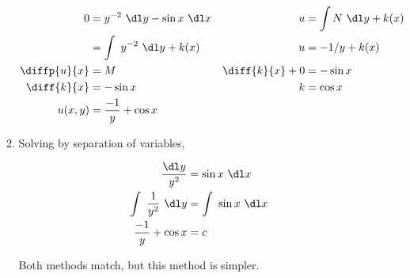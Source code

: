 \begin{enumerate}
\begin{enumerate}
                    \begin{align}
                        0               & = y^{-2}\ \dl y- \sin x\ \dl x &
                        u               & = \int N\ \dl y+ k(x)            \\
                                        & = \int\ y^{-2}\ \dl y+ k(x)    &
                        u               & = -1/y + k(x)                    \\
                        \diffp{u}{x}    & = M                            &
                        \diff{k}{x} + 0 & = -\sin x                        \\
                        \diff{k}{x}     & = -\sin x                      &
                        k               & = \cos x                         \\
                        u(x, y)         & = \frac{-1}{y} + \cos x
                    \end{align}


              \item Solving by separation of variables,

                    \begin{align}
                        \frac{\dl y}{y^{2}}          & = \sin x\ \dl x       \\
                        \int\ \frac{1}{y^{2}}\ \dl y & = \int\ \sin x\ \dl x \\
                        \frac{-1}{y} + \cos x        & = c
                    \end{align}

                    Both methods match, but this method is simpler.


\end{enumerate}
\end{enumerate}
